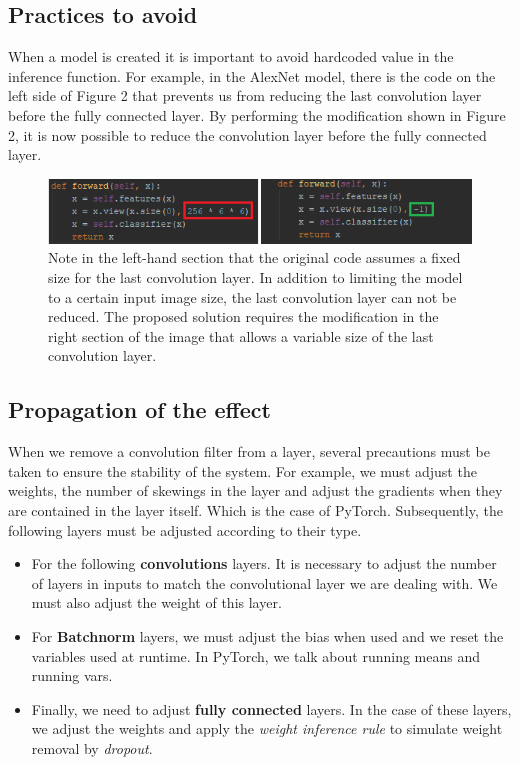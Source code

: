\documentclass[12pt]{article}
\begin{document}
\subsection{Practices to avoid}

When a model is created it is important to avoid hardcoded value in the inference function. For example, in the AlexNet model, there is the code on the left side of Figure 2 that prevents us from reducing the last convolution layer before the fully connected layer. By performing the modification shown in Figure 2, it is now possible to reduce the convolution layer before the fully connected layer.
\begin{figure}[H]
	\centering
	\includegraphics{mistake}
	\caption{Note in the left-hand section that the original code assumes a fixed size for the last convolution layer. In addition to limiting the model to a certain input image size, the last convolution layer can not be reduced. The proposed solution requires the modification in the right section of the image that allows a variable size of the last convolution layer.}
	\label{fig:mistake}
\end{figure}


\subsection{Propagation of the effect}
When we remove a convolution filter from a layer, several precautions must be taken to ensure the stability of the system. For example, we must adjust the weights, the number of skewings in the layer and adjust the gradients when they are contained in the layer itself. Which is the case of PyTorch.
\newpage
Subsequently, the following layers must be adjusted according to their type.
\begin{itemize}[noitemsep, noitemsep, label={}]
	\item For the following \textbf{convolutions} layers. It is necessary to adjust the number of layers in inputs to match the convolutional layer we are dealing with. We must also adjust the weight of this layer.
	\item For \textbf{Batchnorm} layers, we must adjust the bias when used and we reset the variables used at runtime. In PyTorch, we talk about running means and running vars.
	\item Finally, we need to adjust \textbf{fully connected} layers. In the case of these layers, we adjust the weights and apply the \textit{weight inference rule} \cite{weightinference} to simulate weight removal by \textit{dropout}.
\end{itemize}
\end{document}
